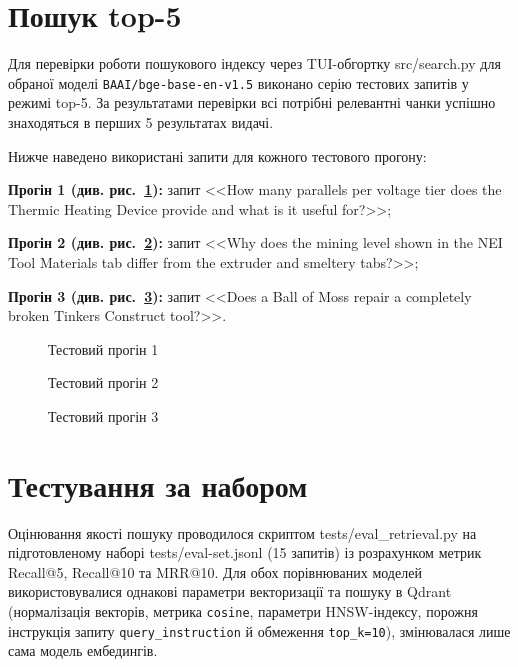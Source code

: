 \section{Пошук top-5}

Для перевірки роботи пошукового індексу через TUI-обгортку src/search.py для обраної моделі \texttt{BAAI/bge-base-en-v1.5} виконано серію тестових запитів у режимі top-5. За результатами перевірки всі потрібні релевантні чанки успішно знаходяться в перших 5 результатах видачі.

Нижче наведено використані запити для кожного тестового прогону:
\begin{dashlist}[wide]
    \item \textbf{Прогін 1 (див. рис.~\ref{fig:top5-test-1}):} запит <<How many parallels per voltage tier does the Thermic Heating Device provide and what is it useful for?>>;
    \item \textbf{Прогін 2 (див. рис.~\ref{fig:top5-test-2}):} запит <<Why does the mining level shown in the NEI Tool Materials tab differ from the extruder and smeltery tabs?>>;
    \item \textbf{Прогін 3 (див. рис.~\ref{fig:top5-test-3}):} запит <<Does a Ball of Moss repair a completely broken Tinkers Construct tool?>>.
\end{dashlist}

\begin{figure}[H]
    \centering
    \caption{Тестовий прогін 1}
    \label{fig:top5-test-1}
\end{figure}

\begin{figure}[H]
    \centering
    \caption{Тестовий прогін 2}
    \label{fig:top5-test-2}
\end{figure}

\begin{figure}[H]
    \centering
    \caption{Тестовий прогін 3}
    \label{fig:top5-test-3}
\end{figure}

\section{Тестування за набором}

Оцінювання якості пошуку проводилося скриптом tests/eval\_retrieval.py на підготовленому наборі tests/eval-set.jsonl (15 запитів) із розрахунком метрик Recall@5, Recall@10 та MRR@10. Для обох порівнюваних моделей використовувалися однакові параметри векторизації та пошуку в Qdrant (нормалізація векторів, метрика \texttt{cosine}, параметри HNSW-індексу, порожня інструкція запиту \texttt{query\_instruction} й обмеження \texttt{top\_k=10}), змінювалася лише сама модель ембедингів.

